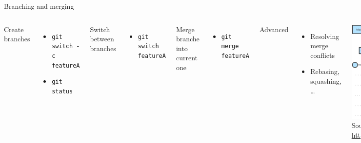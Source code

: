 \documentclass[aspectratio=169]{beamer}
\newcommand{\code}[1]{\texttt{\color{mygreen}#1}}
\begin{document}
\begin{frame}
  {Branching and merging}

  \begin{columns}
  Create branches
  \begin{itemize}
    \item[\$] \code{git switch -c featureA}
    \item[\$] \code{git status}
  \end{itemize}

  Switch between branches
  \begin{itemize}
    \item[\$] \code{git switch featureA}
  \end{itemize}

  Merge branche into current one
  \begin{itemize}
    \item[\$] \code{git merge featureA}
  \end{itemize}

  Advanced
  \begin{itemize}
    \item Resolving merge conflicts
    \item Rebasing, squashing, \ldots
  \end{itemize}



    \includegraphics[width=\textwidth]{git-png-branch}
  {\tiny Source: \url{https://www.vippng.com/maxp/hbmmiRx/}}
  \end{columns}

\end{frame}
\end{document}
